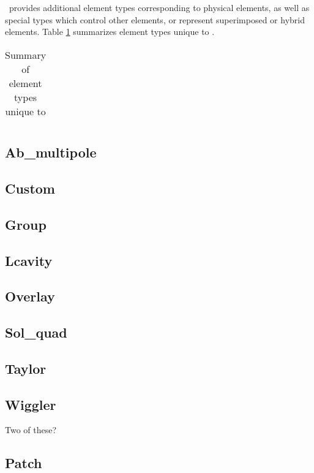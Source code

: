 \bmad\ provides additional element types corresponding to physical elements, 
as well as special types which control other elements, or represent
superimposed or hybrid elements.  Table \ref{tab:bmad_elements}
summarizes element types unique to \bmad.

\begin{table}\label{tab:bmad_elements}\center
{\tt\begin{tabular}{|l|l|} \hline

\end{tabular}}
\caption{Summary of element types unique to \bmad}
\end{table}
\subsection{Ab\_multipole}
\subsection{Custom}
\subsection{Group}
\subsection{Lcavity}
\subsection{Overlay}
\subsection{Sol\_quad}
\subsection{Taylor}
\subsection{Wiggler} Two of these?
\subsection{Patch}
